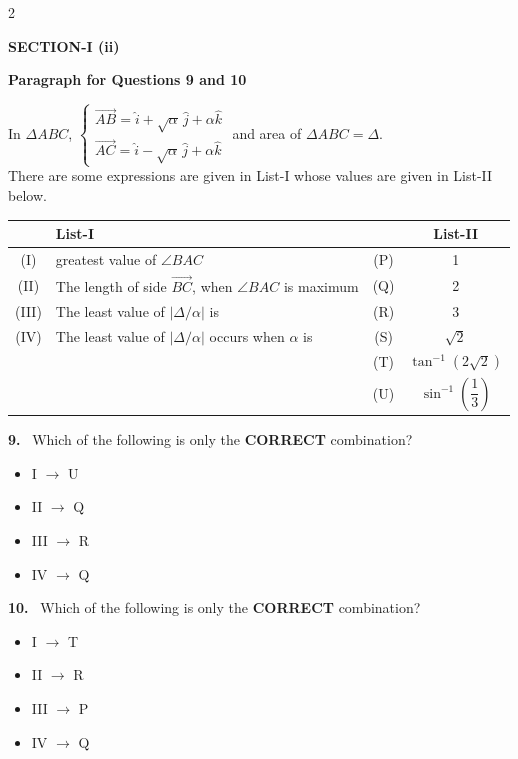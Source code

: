 \documentclass[10pt]{extarticle}
\newcommand{\sect}[1]{\par\smallskip\noindent\textbf{#1}\par}
\newcommand{\qn}[1]{\par\smallskip\noindent\textbf{#1.}~}
\newcommand{\paraq}[2]{\par\smallskip\noindent\textbf{Paragraph for Questions #1 and #2}\par}
\newenvironment{qoptions}{\begin{itemize}[leftmargin=1.8em,itemsep=1pt,topsep=2pt,label={}]}{\end{itemize}}
\newcommand{\opt}[2]{\item[(#1)] #2}
\begin{document}
\begin{multicols}{2}
\sect{SECTION-I (ii)}
\paraq{9}{10}
In $\Delta ABC$, $\begin{cases}\overrightarrow{AB}=\hat i+\sqrt\alpha\,\hat j+\alpha\hat k\\ \overrightarrow{AC}=\hat i-\sqrt\alpha\,\hat j+\alpha\hat k\end{cases}$ and area of $\Delta ABC=\Delta$.\\
There are some expressions are given in List-I whose values are given in List-II below.
\par\smallskip
\begin{center}\small
\renewcommand{\arraystretch}{1.2}
\begin{tabular}{|c|p{4.2cm}|c|c|}
\hline
 & \centering List-I & & List-II\\
\hline
(I) & greatest value of $\angle BAC$ & (P) & 1\\
\hline
(II) & The length of side $\overrightarrow{BC}$, when $\angle BAC$ is maximum & (Q) & 2\\
\hline
(III) & The least value of $|\Delta/\alpha|$ is & (R) & 3\\
\hline
(IV) & The least value of $|\Delta/\alpha|$ occurs when $\alpha$ is & (S) & $\sqrt2$\\
\hline
 & & (T) & $\tan^{-1}\!\left(2\sqrt2\right)$\\
\hline
 & & (U) & $\sin^{-1}\!\left(\dfrac13\right)$\\
\hline
\end{tabular}
\end{center}
\qn{9} Which of the following is only the \textbf{CORRECT} combination?
\begin{qoptions}
\opt{A}{I $\to$ U}
\opt{B}{II $\to$ Q}
\opt{C}{III $\to$ R}
\opt{D}{IV $\to$ Q}
\end{qoptions}

\qn{10} Which of the following is only the \textbf{CORRECT} combination?
\begin{qoptions}
\opt{A}{I $\to$ T}
\opt{B}{II $\to$ R}
\opt{C}{III $\to$ P}
\opt{D}{IV $\to$ Q}
\end{qoptions}


\end{multicols}
\end{document}
